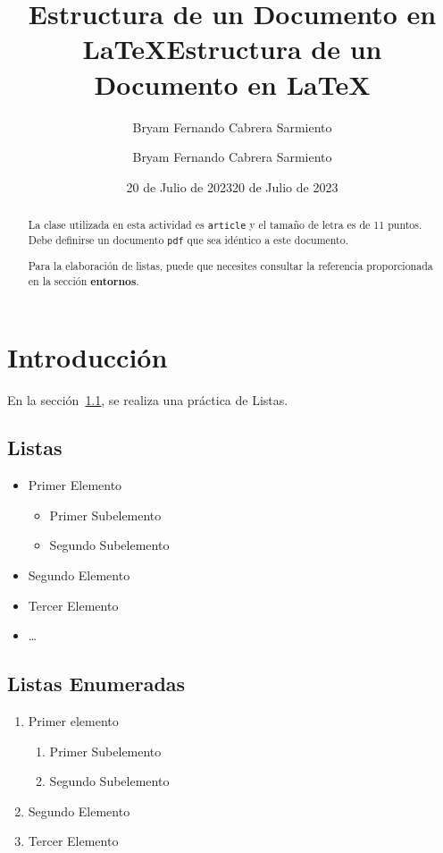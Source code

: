 \documentclass{article}
\title{\color{red}Estructura de un Documento en \LaTeX}
\author{Bryam Fernando Cabrera Sarmiento}
\date{20 de Julio de 2023}
\title{\color{red}Estructura de un Documento en \LaTeX}
\author{Bryam Fernando Cabrera Sarmiento}
\date{20 de Julio de 2023}
\theoremstyle{mytheoremstyle}
\theoremstyle{mytheoremstyle}
\theoremstyle{myproblemstyle}
\begin{document}
    \maketitle
    
    \begin{abstract}
        La clase utilizada en esta actividad es \verb|article| y el tamaño de letra es de 11 puntos. Debe definirse un documento \verb|pdf| que sea idéntico a este documento.
        
        Para la elaboración de listas, puede que necesites consultar la referencia proporcionada en la sección \textbf{entornos}.
    \end{abstract}
    
    \section{Introducción}\label{sec:1}
    En la sección~\ref{SB1}, se realiza una práctica de Listas.
    
    \subsection{Listas}\label{SB1}
    \begin{itemize}
        \item Primer Elemento
        \begin{itemize}
            \item Primer Subelemento
            \item Segundo Subelemento
        \end{itemize}
        \item Segundo Elemento
        \item Tercer Elemento
        \item \ldots
    \end{itemize}
    
    \subsection{Listas Enumeradas}\label{SB2}
    \begin{enumerate}
        \item Primer elemento
        \begin{enumerate}
            \item Primer Subelemento
            \item Segundo Subelemento
        \end{enumerate}
        \item Segundo Elemento
        \item Tercer Elemento
    \end{enumerate}
    
\end{document}
